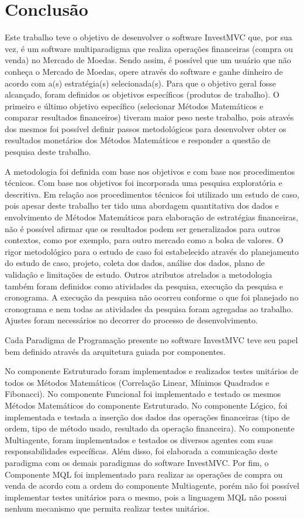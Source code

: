 \chapter{Conclusão}

Este trabalho teve o objetivo de desenvolver o software InvestMVC que, por sua vez, é um software multiparadigma que realiza operações financeiras (compra ou venda) no Mercado de Moedas. Sendo assim, é possível que um usuário que não conheça o Mercado de Moedas, opere através do software e ganhe dinheiro de acordo com a(s) estratégia(s) selecionada(s). Para que o objetivo geral fosse alcançado, foram definidos os objetivos específicos (produtos de trabalho). O primeiro e último objetivo específico (selecionar Métodos Matemáticos e comparar resultados financeiros) tiveram maior peso neste trabalho, pois através dos mesmos foi possível definir passos metodológicos para desenvolver obter os resultados monetários dos Métodos Matemáticos e responder a questão de pesquisa deste trabalho.

A metodologia foi definida com base nos objetivos e com base nos procedimentos técnicos. Com base nos objetivos foi incorporada uma pesquisa exploratória e descritiva. Em relação aos procedimentos técnicos foi utilizado um estudo de caso, pois apesar deste trabalho ter tido uma abordagem quantitativa dos dados e envolvimento de Métodos Matemáticos para elaboração de estratégias financeiras, não é possível afirmar que os resultados podem ser generalizados para outros contextos, como por exemplo, para outro mercado como a bolsa de valores. O rigor metodológico para o estudo de caso foi estabelecido através do planejamento do estudo de caso, projeto, coleta dos dados, análise dos dados, plano de validação e limitações de estudo.
Outros atributos atrelados a metodologia também foram definidos como atividades da pesquisa, execução da pesquisa e cronograma. A execução da pesquisa não ocorreu conforme o que foi planejado no cronograma e nem todas as atividades da pesquisa foram agregadas ao trabalho. Ajustes foram necessários no decorrer do processo de desenvolvimento.

Cada Paradigma de Programação presente no software InvestMVC teve seu papel bem definido através da arquitetura guiada por componentes. 

No componente Estruturado foram implementados e realizados testes unitários de todos os Métodos Matemáticos (Correlação Linear, Mínimos Quadrados e Fibonacci). No componente Funcional foi implementado e testado os mesmos Métodos Matemáticos do componente Estruturado. No componente Lógico, foi implementada e testada a inserção dos dados das operações financeiras (tipo de ordem, tipo de método usado, resultado da operação financeira). No componente Multiagente, foram implementados e testados os diversos agentes com suas responsabilidades específicas. Além disso, foi elaborada a comunicação deste paradigma com os demais paradigmas do software InvestMVC. Por fim, o Componente MQL foi implementado para realizar as operações de compra ou venda de acordo com a ordem do componente Multiagente, porém não foi possível implementar testes unitários para o mesmo, pois a linguagem MQL não possui nenhum mecanismo que permita realizar testes unitários.

